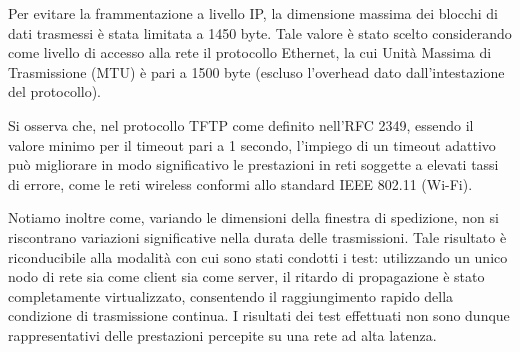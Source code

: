 \documentclass[12pt]{article}
\begin{document}
{Per evitare la frammentazione a livello IP, la dimensione massima dei blocchi di dati trasmessi è stata limitata a 1450 byte.
Tale valore è stato scelto considerando come livello di accesso alla rete il protocollo Ethernet, la cui Unità Massima di Trasmissione (MTU) è pari a 1500 byte (escluso l'overhead dato dall'intestazione del protocollo).



Si osserva che, nel protocollo TFTP come definito nell'RFC 2349, essendo il valore minimo per il timeout pari a 1 secondo, l'impiego di un timeout adattivo può migliorare in modo significativo le prestazioni in reti soggette a elevati tassi di errore, come le reti wireless conformi allo standard IEEE 802.11 (Wi-Fi).

Notiamo inoltre come, variando le dimensioni della finestra di spedizione, non si riscontrano variazioni significative nella durata delle trasmissioni. Tale risultato è riconducibile alla modalità con cui sono stati condotti i test: utilizzando un unico nodo di rete sia come client sia come server, il ritardo di propagazione è stato completamente virtualizzato, consentendo il raggiungimento rapido della condizione di trasmissione continua. I risultati dei test effettuati non sono dunque rappresentativi delle prestazioni percepite su una rete ad alta latenza.

}
\end{document}

